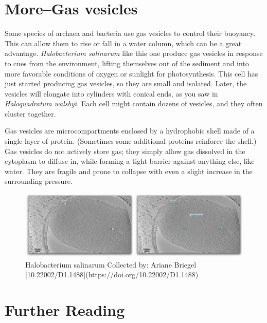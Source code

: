 \documentclass[]{tufte-book}
\begin{document}
\hypertarget{moregas-vesicles}{\section{More--Gas
vesicles}\label{moregas-vesicles}}

Some species of archaea and bacteria use gas vesicles to control their
buoyancy. This can allow them to rise or fall in a water column, which
can be a great advantage. \emph{Halobacterium salinarum} like this one
produce gas vesicles in response to cues from the environment, lifting
themselves out of the sediment and into more favorable conditions of
oxygen or sunlight for photosynthesis. This cell has just started
producing gas vesicles, so they are small and isolated. Later, the
vesicles will elongate into cylinders with conical ends, as you saw in
\emph{Haloquadratum walsbyi}. Each cell might contain dozens of
vesicles, and they often cluster together.

Gas vesicles are microcompartments enclosed by a hydrophobic shell made
of a single layer of protein. (Sometimes some additional proteins
reinforce the shell.) Gas vesicles do not actively store gas; they
simply allow gas dissolved in the cytoplasm to diffuse in, while forming
a tight barrier against anything else, like water. They are fragile and
prone to collapse with even a slight increase in the surrounding
pressure.

\begin{figure}
\includegraphics{movie_stills/3_7a} \caption[Halobacterium salinarum Collected by]{Halobacterium salinarum Collected by: Ariane Briegel [10.22002/D1.1488](https://doi.org/10.22002/D1.1488)}\label{fig:unnamed-chunk-58}
\end{figure}

\section{Further Reading}\label{further-reading-2}

\citet{barry2011} \citet{pfeifer2012} \citet{pilhofer2013}
\citet{young2006}
\end{document}

